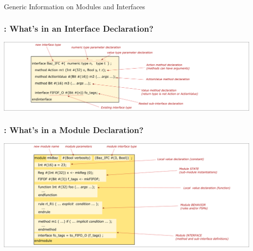 \begin{frame}

\begin{center}
  {\LARGE Generic Information on Modules and Interfaces}
\end{center}

\end{frame}


\begin{frame}
\frametitle{{\BSV}: What's in an Interface Declaration?}

\begin{center}
\includegraphics[width=\textwidth]{../Figures/Fig_BSV_whats_in_an_interface_decl}
\end{center}

\end{frame}


\begin{frame}
\frametitle{{\BSV}: What's in a Module Declaration?}

\begin{center}
\includegraphics[width=\textwidth]{../Figures/Fig_BSV_whats_in_a_module_decl}
\end{center}

\end{frame}


